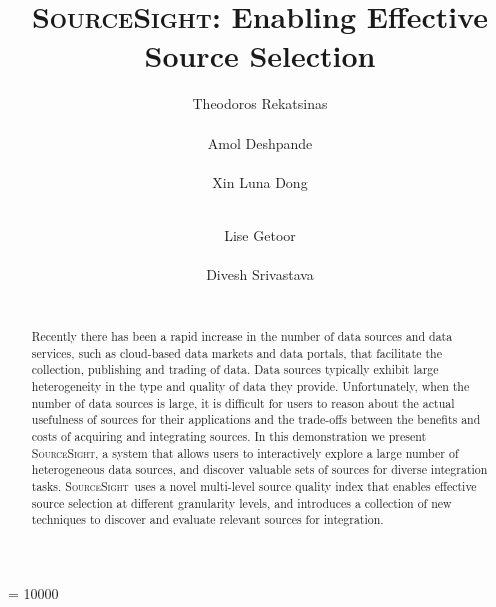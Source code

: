 \documentclass{sig-alternate-05-2015}
\newcommand\system{\textsc{SourceSight}}
\begin{document}
 

\widowpenalty = 10000

\title{{\LARGE \system}: Enabling Effective Source Selection}


\author{
\alignauthor
Theodoros Rekatsinas\\
       \\
\alignauthor
Amol Deshpande\\
       \\
\alignauthor 
Xin Luna Dong\\
       \\
\and  %
\alignauthor 
Lise Getoor\\
       \\
\alignauthor Divesh Srivastava\\
       \\
}

\maketitle

\begin{abstract}
Recently there has been a rapid increase in the number of data sources and data services, such as cloud-based data markets and data portals, that facilitate the collection, publishing and trading of data. Data sources typically exhibit large heterogeneity in the type and quality of data they provide. Unfortunately, when the number of data sources is large, it is difficult for users to reason about the actual usefulness of sources for their applications and the trade-offs between the benefits and costs of acquiring and integrating sources. In this demonstration we present \system, a system that allows users to interactively explore a large number of heterogeneous data sources, and discover valuable sets of sources for diverse integration tasks. \system~uses a novel multi-level source quality index that enables effective source selection at different granularity levels, and introduces a collection of new techniques to discover and evaluate relevant sources for integration.
\end{abstract}
\end{document}
